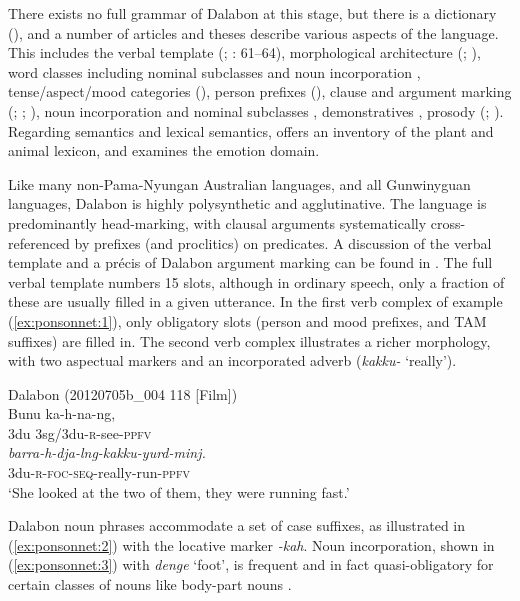 \documentclass[output=paper]{langscibook}
\begin{document}
There exists no full grammar of Dalabon at this stage, but there is a dictionary (\citealt{EvansEvans2004}), and a number of articles and theses describe various aspects of the language. This includes the verbal template (\citealt{evans2003dalabon}; \citealt{Ponsonnet2014a}: 61–64), morphological architecture (\citealt{Evans2017}; \citealt{PonsonnetPonsonnet2015}), word classes including nominal subclasses and noun incorporation \citep{Ponsonnet2015}, tense/aspect/mood categories (\citealt{evans2003dalabon}), person prefixes (\citealt{EvansEvans2001}), clause and argument marking (\citealt{Evans2006}; \citealt{LukLuk2019}; \citealt{Ponsonnet2021}), noun incorporation and nominal subclasses \citep{Ponsonnet2015}, demonstratives \citep{Cutfield2011}, prosody (\citealt{EvansEvans2008}; \citealt{Ross2011}). Regarding semantics and lexical semantics, \citet{BordlukBordluk2013} offers an inventory of the plant and animal lexicon, and \citet{Ponsonnet2014a} examines the emotion domain.

Like many non-Pama-Nyungan Australian languages, and all Gunwinyguan languages, Dalabon is highly polysynthetic and agglutinative. The language is predominantly head-marking, with clausal arguments systematically cross\hyp referenced by prefixes (and proclitics) on predicates. A discussion of the verbal template and a précis of Dalabon argument marking can be found in \citet[60–62, 152--154]{Ponsonnet2014a}. The full verbal template numbers 15 slots, although in ordinary speech, only a fraction of these are usually filled in a given utterance. In the first verb complex of example (\ref{ex:ponsonnet:1}), only obligatory slots (person and mood prefixes, and TAM suffixes) are filled in. The second verb complex illustrates a richer morphology, with two aspectual markers and an incorporated adverb (\textit{kakku-} ‘really’).

\largerpage
\ea
\label{ex:ponsonnet:1}
Dalabon (20120705b\_004 118 [Film])\\
\gll   Bunu   ka-h-na-ng,    \\
     3du  3sg/3du-\textsc{r}{}-see-\textsc{ppfv}\\
\gll     \textit{barra-h-dja-lng-kakku-yurd-minj.}\\
     3du-\textsc{r}{}-\textsc{foc}{}-\textsc{seq}{}-really-run-\textsc{ppfv}\\
\glt ‘She looked at the two of them, they were running fast.’
\z 

Dalabon noun phrases accommodate a set of case suffixes, as illustrated in (\ref{ex:ponsonnet:2}) with the locative marker \textit{{}-kah}. Noun incorporation, shown in (\ref{ex:ponsonnet:3}) with \textit{denge} ‘foot’, is frequent and in fact quasi-obligatory for certain classes of nouns like body-part nouns \citep{Ponsonnet2015}. 
\end{document}
